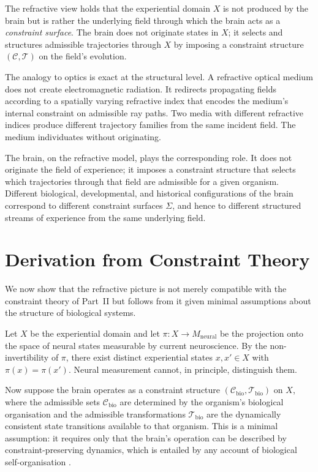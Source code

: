 \documentclass[11pt,openany]{book}
\begin{document}
The refractive view holds that the experiential domain $X$
is not produced by the brain but is rather the underlying
field through which the brain acts as a \emph{constraint
surface}.  The brain does not originate states in $X$; it
selects and structures admissible trajectories through $X$
by imposing a constraint structure $(\mathcal{C},
\mathcal{T})$ on the field's evolution.

The analogy to optics is exact at the structural level.
A refractive optical medium does not create electromagnetic
radiation.  It redirects propagating fields according to a
spatially varying refractive index that encodes the medium's
internal constraint on admissible ray paths.  Two media with
different refractive indices produce different trajectory
families from the same incident field.  The medium
individuates without originating.

The brain, on the refractive model, plays the corresponding
role.  It does not originate the field of experience; it
imposes a constraint structure that selects which
trajectories through that field are admissible for a given
organism.  Different biological, developmental, and
historical configurations of the brain correspond to
different constraint surfaces $\Sigma$, and hence to
different structured streams of experience from the same
underlying field.

\section{Derivation from Constraint Theory}
\label{sec:derivation}

We now show that the refractive picture is not merely
compatible with the constraint theory of Part~II but
follows from it given minimal assumptions about the
structure of biological systems.

Let $X$ be the experiential domain and let
$\pi : X \to M_{\mathrm{neural}}$ be the projection onto
the space of neural states measurable by current
neuroscience.  By the non-invertibility of $\pi$, there
exist distinct experiential states $x, x' \in X$ with
$\pi(x) = \pi(x')$.  Neural measurement cannot, in
principle, distinguish them.

Now suppose the brain operates as a constraint structure
$(\mathcal{C}_{\mathrm{bio}}, \mathcal{T}_{\mathrm{bio}})$
on $X$, where the admissible sets
$\mathcal{C}_{\mathrm{bio}}$ are determined by the
organism's biological organisation and the admissible
transformations $\mathcal{T}_{\mathrm{bio}}$ are the
dynamically consistent state transitions available to that
organism.  This is a minimal assumption: it requires only
that the brain's operation can be described by
constraint-preserving dynamics, which is entailed by any
account of biological self-organisation
\citep{varela1991embodied, prigogine1984order}.
\end{document}
